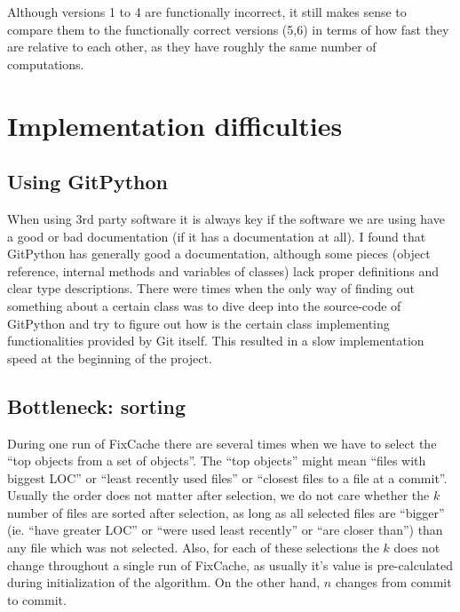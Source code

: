 \documentclass[12pt,twoside,notitlepage]{report}
\newcommand{\fxch}{FixCache}
\begin{document}
Although versions 1 to 4 are functionally incorrect, it still makes sense to compare them to the functionally correct versions (5,6) in terms of how fast they are relative to each other, as they have roughly the same number of computations.
\section{Implementation difficulties}
\subsection{Using GitPython}
When using 3rd party software it is always key if the software we are using have a good or bad documentation (if it has a documentation at all). I found that GitPython has generally good a documentation, although some pieces (object reference, internal methods and variables of classes) lack proper definitions and clear type descriptions. There were times when the only way of finding out something about a certain class was to dive deep into the source-code of GitPython and try to figure out how is the certain class implementing functionalities provided by Git itself. This resulted in a slow implementation speed at the beginning of the project.
\subsection{Bottleneck: sorting}
During one run of \fxch{} there are several times when we have to select the ``top objects from a set of objects''. The ``top objects'' might mean ``files with biggest LOC'' or ``least recently used files'' or ``closest files to a file at a commit''. Usually the order does not matter after selection, we do not care whether the $k$ number of files are sorted after selection, as long as all selected files are ``bigger'' (ie. ``have greater LOC'' or ``were used least recently'' or ``are closer than'') than any file which was not selected. Also, for each of these selections the $k$ does not change throughout a single run of \fxch{}, as usually it's value is pre-calculated during initialization of the algorithm. On the other hand, $n$ changes from commit to commit.
\end{document}
